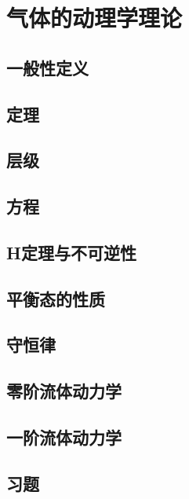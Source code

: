 \chapter{气体的动理学理论}

\section{一般性定义}
\section{定理}
\section{层级}
\section{{\boltzmann}方程}
\section{H定理与不可逆性}
\section{平衡态的性质}
\section{守恒律}
\section{零阶流体动力学}
\section{一阶流体动力学}
\section*{习题}